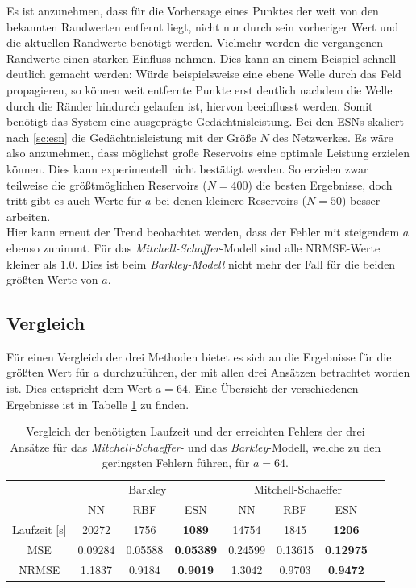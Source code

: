 Es ist anzunehmen, dass für die Vorhersage eines Punktes der weit von den bekannten Randwerten entfernt liegt, nicht nur durch sein vorheriger Wert und die aktuellen Randwerte benötigt werden. Vielmehr werden die vergangenen Randwerte einen starken Einfluss nehmen. Dies kann an einem Beispiel schnell deutlich gemacht werden: Würde beispielsweise eine ebene Welle durch das Feld propagieren, so können weit entfernte Punkte erst deutlich nachdem die Welle durch die Ränder hindurch gelaufen ist, hiervon beeinflusst werden. Somit benötigt das System eine ausgeprägte Gedächtnisleistung. Bei den \textsc{ESN}s skaliert nach \ref{sc:esn} die Gedächtnisleistung mit der Größe $N$ des Netzwerkes. Es wäre also anzunehmen, dass möglichst große Reservoirs eine optimale Leistung erzielen können. Dies kann experimentell nicht bestätigt werden. So erzielen zwar teilweise die größtmöglichen Reservoirs ($N=400$) die besten Ergebnisse, doch tritt gibt es auch Werte für $a$ bei denen kleinere Reservoirs ($N=50$) besser arbeiten.\\

Hier kann erneut der Trend beobachtet werden, dass der Fehler mit steigendem $a$ ebenso zunimmt. Für das \textit{Mitchell-Schaffer}-Modell sind alle NRMSE-Werte kleiner als $1.0$. Dies ist beim \textit{Barkley-Modell} nicht mehr der Fall für die beiden größten Werte von $a$. 

\subsection{Vergleich}
Für einen Vergleich der drei Methoden bietet es sich an die Ergebnisse für die größten Wert für $a$ durchzuführen, der mit allen drei Ansätzen betrachtet worden ist. Dies entspricht dem Wert $a=64$. Eine Übersicht der verschiedenen Ergebnisse ist in Tabelle \ref{tab:exp_inner_cross_comparison_results} zu finden.

\begin{table}[h]
	\centering
	\captionsetup{width=0.9\linewidth}
	\begin{tabular}{|c|c|c|c|c|c|c|c|}
		\multicolumn{1}{c|}{} & \multicolumn{3}{c|}{Barkley} & \multicolumn{3}{c|}{Mitchell-Schaeffer}		\\
		\cline{2-7}
		\multicolumn{1}{c|}{} & NN & RBF & ESN & NN & RBF & ESN \\
		
		\hline
		\hline
		
		Laufzeit [s] 	& 20272 	& 1756		& \textbf{1089}		& 14754		&  	1845	& \textbf{1206} \\
		\hline
		MSE 			& 0.09284	& 0.05588	& 	\textbf{0.05389} 		& 0.24599	& 0.13615 	& \textbf{0.12975}	 \\
		\hline
		NRMSE 			& 1.1837	& 0.9184	& \textbf{0.9019} 			& 1.3042	& 0.9703 	& \textbf{0.9472} \\
		\hline 
	\end{tabular} 
	\caption{Vergleich der benötigten Laufzeit und der erreichten Fehlers der drei Ansätze für das \textit{Mitchell-Schaeffer}- und das \textit{Barkley}-Modell, welche zu den geringsten Fehlern führen, für $a=64$.}
	\label{tab:exp_inner_cross_comparison_results}
\end{table}

